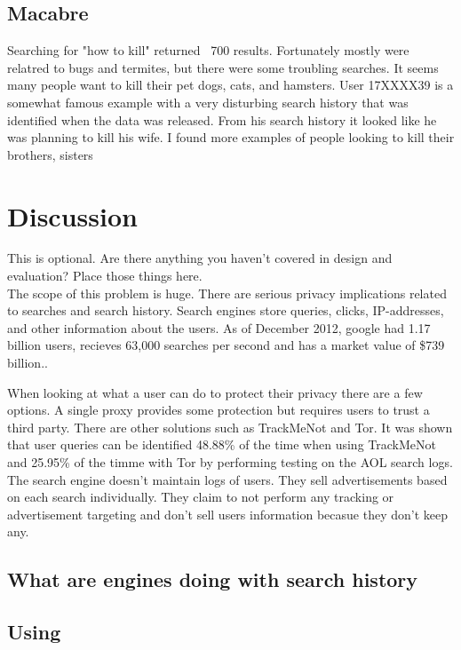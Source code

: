 \documentclass{article}
\begin{document}
\subsection{Macabre}
Searching for "how to kill" returned ~700 results. Fortunately mostly were relatred to bugs and termites, but there were some troubling searches. It seems many people want to kill their pet dogs, cats, and hamsters. User 17XXXX39 is a somewhat famous example\cite{murder} with a very disturbing search history that was identified when the data was released. From his search history it looked like he was planning to kill his wife. I found more examples of people looking to kill their brothers, sisters
\section{Discussion}
This is optional. Are there anything you haven't covered in design and evaluation? Place those things here.\\

The scope of this problem is huge. There are serious privacy implications related to searches and search history. Search engines store queries, clicks, IP-addresses, and other information about the users. As of December 2012, google had 1.17 billion users\cite{google1}, recieves 63,000 searches per second and has a market value of \$739 billion.\cite{google}.

When looking at what a user can do to protect their privacy there are a few options. A single proxy provides some protection but requires users to trust a third party. There are other solutions such as TrackMeNot and Tor. It was shown that user queries can be identified 48.88\% of the time when using TrackMeNot and 25.95\% of the timme with Tor by performing testing on the AOL search logs\cite{TMN-Tor}. The search engine  doesn't maintain logs of users. They sell advertisements based on each search individually. They claim to not perform any tracking or advertisement targeting and don't sell users information becasue they don't keep any.

\subsection{What are engines doing with search history}

\subsection{Using }
\end{document}
